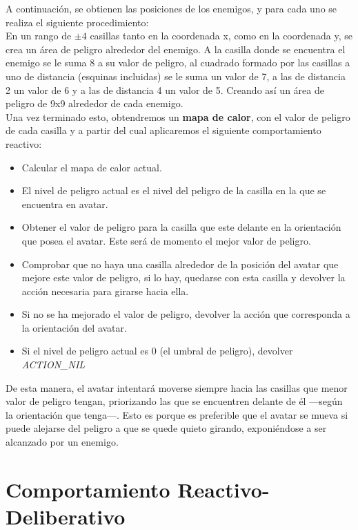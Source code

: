 A continuación, se obtienen las posiciones de los enemigos, y para cada uno se realiza el siguiente procedimiento: \\
En un rango de $\pm 4$ casillas tanto en la coordenada x, como en la coordenada y, se crea un área de peligro alrededor del enemigo. A la casilla donde se encuentra el enemigo se le suma 8 a su valor de peligro, al cuadrado formado por las casillas a uno de distancia (esquinas incluidas) se le suma un valor de 7, a las de distancia 2 un valor de 6 y a las de distancia 4 un valor de 5. Creando así un área de peligro de 9x9 alrededor de cada enemigo.\\

Una vez terminado esto, obtendremos un \textbf{mapa de calor}, con el valor de peligro de cada casilla y a partir del cual aplicaremos el siguiente comportamiento reactivo:
\begin{itemize}
   \item Calcular el mapa de calor actual.
   \item El nivel de peligro actual es el nivel del peligro de la casilla en la que se encuentra en avatar.
   \item Obtener el valor de peligro para la casilla que este delante en la orientación que posea el avatar. Este será de momento el mejor valor de peligro.
   \item Comprobar que no haya una casilla alrededor de la posición del avatar que mejore este valor de peligro, si lo hay, quedarse con esta casilla y devolver la acción necesaria para girarse hacia ella.
   \item Si no se ha mejorado el valor de peligro, devolver la acción que corresponda a la orientación del avatar.
   \item Si el nivel de peligro actual es 0 (el umbral de peligro), devolver \emph{ACTION\_NIL}
\end{itemize}

De esta manera, el avatar intentará moverse siempre hacia las casillas que menor valor de peligro tengan, priorizando las que se encuentren delante de él ---según la orientación que tenga---. Esto es porque es preferible que el avatar se mueva si puede alejarse del peligro a que se quede quieto girando, exponiéndose a ser alcanzado por un enemigo.

\newpage
\chapter{Comportamiento Reactivo-Deliberativo}

